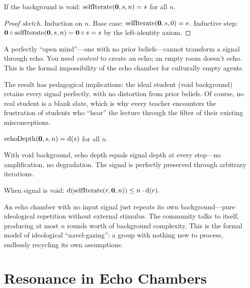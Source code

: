 \begin{theorem}
\label{thm:void-background}
If the background is void:
$\mathrm{selfIterate}(\mathbf{0}, s, n) = s$ for all $n$.
\end{theorem}

\begin{proof}[Proof sketch]
Induction on $n$.  Base case: $\mathrm{selfIterate}(\mathbf{0},s,0)=s$.
Inductive step: $\mathbf{0}\circ\mathrm{selfIterate}(\mathbf{0},s,n)
= \mathbf{0}\circ s = s$ by the left-identity axiom.
\end{proof}

A perfectly ``open mind''---one with no prior beliefs---cannot transform a
signal through echo.  You need \emph{content} to create an echo; an empty
room doesn't echo.  This is the formal impossibility of the echo chamber
for culturally empty agents.

The result has pedagogical implications: the ideal student (void background)
retains every signal perfectly, with no distortion from prior beliefs.  Of
course, no real student is a blank slate, which is why every teacher
encounters the frustration of students who ``hear'' the lecture through the
filter of their existing misconceptions.

\begin{theorem}
\label{thm:void-background-depth}
$\mathrm{echoDepth}(\mathbf{0}, s, n) = \operatorname{d}(s)$ for all $n$.
\end{theorem}

With void background, echo depth equals signal depth at every step---no
amplification, no degradation.  The signal is perfectly preserved through
arbitrary iterations.

\begin{theorem}
\label{thm:echo-void-signal}
When signal is void:
$\operatorname{d}(\mathrm{selfIterate}(r, \mathbf{0}, n)) \le n\cdot\operatorname{d}(r).$
\end{theorem}

An echo chamber with no input signal just repeats its own background---pure
ideological repetition without external stimulus.  The community talks to
itself, producing at most $n$ rounds worth of background complexity.  This
is the formal model of ideological ``navel-gazing'': a group with nothing
new to process, endlessly recycling its own assumptions.


\section{Resonance in Echo Chambers}
\label{sec:echo-resonance}

